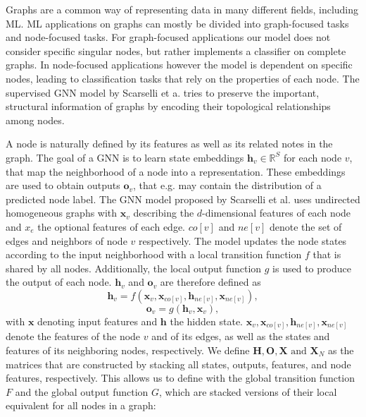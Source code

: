 Graphs are a common way of representing data in many different fields, including ML. ML applications on graphs can mostly be divided into graph-focused tasks and node-focused tasks. For graph-focused applications our model does not consider specific singular nodes, but rather implements a classifier on complete graphs. In node-focused applications however the model is dependent on specific nodes, leading to classification tasks that rely on the properties of each node.
The supervised GNN model by Scarselli et a.\cite{4700287} tries to preserve the important,  structural information of graphs by encoding their topological relationships among nodes.

A node is naturally defined by its features as well as its related notes in the graph. The goal of a GNN is to learn state embeddings $\mathbf{h}_v \in \mathbb{R}^S$ for each node $v$, that map the neighborhood of a node into a representation. These embeddings are used to obtain outputs $\mathbf{o}_v$, that e.g. may contain the distribution of a predicted node label. The GNN model proposed by Scarselli et al.\cite{4700287} uses undirected homogeneous graphs with $\mathbf{x}_v$ describing the $d$-dimensional features of each node and $x_e$ the optional features of each edge. $co[v]$ and $ne[v]$ denote the set of edges and neighbors of node $v$ respectively. The model updates the node states according to the input neighborhood with a local transition function $f$ that is shared by all nodes. Additionally, the local output function $g$ is used to produce the output of each node. $\mathbf{h}_v$ and $\mathbf{o}_v$ are therefore defined as
\begin{equation}
    \mathbf{h}_v = f(\mathbf{x}_v, \mathbf{x}_{co[v]}, \mathbf{h}_{ne[v]}, \mathbf{x}_{ne[v]}),
    \label{eq:gnn_state_local}
\end{equation}
\begin{equation}
    \mathbf{o}_v = g(\mathbf{h}_v, \mathbf{x}_v),
\end{equation}
with $\mathbf{x}$ denoting input features and $\mathbf{h}$ the hidden state. $\mathbf{x}_v, \mathbf{x}_{co[v]}, \mathbf{h}_{ne[v]}, \mathbf{x}_{ne[v]}$ denote the features of the node $v$ and of its edges, as well as the states and features of its neighboring nodes, respectively. We define $\mathbf{H}, \mathbf{O}, \mathbf{X} \text{ and  }\mathbf{X}_N$ as the matrices that are constructed by stacking all states, outputs, features, and node features, respectively. This allows us to define with the global transition function $F$ and the global output function $G$, which are stacked versions of their local equivalent for all nodes in a graph: 
